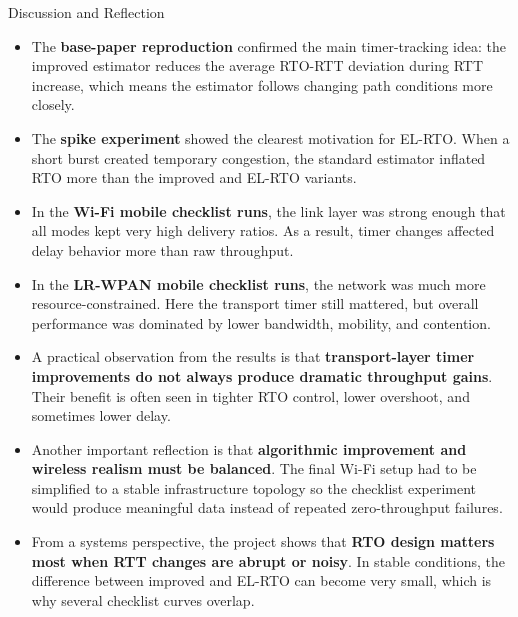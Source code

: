 \documentclass[aspectratio=169]{beamer}
\begin{document}
\begin{frame}{Discussion and Reflection}
  \begin{itemize}
    \item The \textbf{base-paper reproduction} confirmed the main timer-tracking idea: the improved estimator reduces the average RTO-RTT deviation during RTT increase, which means the estimator follows changing path conditions more closely.
    \item The \textbf{spike experiment} showed the clearest motivation for EL-RTO. When a short burst created temporary congestion, the standard estimator inflated RTO more than the improved and EL-RTO variants.
    \item In the \textbf{Wi-Fi mobile checklist runs}, the link layer was strong enough that all modes kept very high delivery ratios. As a result, timer changes affected delay behavior more than raw throughput.
    \item In the \textbf{LR-WPAN mobile checklist runs}, the network was much more resource-constrained. Here the transport timer still mattered, but overall performance was dominated by lower bandwidth, mobility, and contention.
    \item A practical observation from the results is that \textbf{transport-layer timer improvements do not always produce dramatic throughput gains}. Their benefit is often seen in tighter RTO control, lower overshoot, and sometimes lower delay.
    \item Another important reflection is that \textbf{algorithmic improvement and wireless realism must be balanced}. The final Wi-Fi setup had to be simplified to a stable infrastructure topology so the checklist experiment would produce meaningful data instead of repeated zero-throughput failures.
    \item From a systems perspective, the project shows that \textbf{RTO design matters most when RTT changes are abrupt or noisy}. In stable conditions, the difference between improved and EL-RTO can become very small, which is why several checklist curves overlap.
  \end{itemize}
\end{frame}
\end{document}
